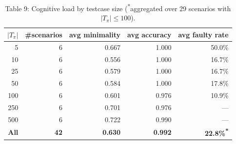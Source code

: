 \begin{table}[htbp]
\centering
\scriptsize
\begin{tabular}{rrrrr}
\toprule
$|T_\pi|$ & \#scenarios & avg minimality & avg accuracy & avg faulty rate \\
\midrule
5 & 6 & 0.667 & 1.000 & 50.0\% \\
10 & 6 & 0.556 & 1.000 & 16.7\% \\
25 & 6 & 0.579 & 1.000 & 16.7\% \\
50 & 6 & 0.584 & 1.000 & 17.8\% \\
100 & 6 & 0.601 & 0.976 & 10.9\% \\
250 & 6 & 0.701 & 0.976 & — \\
500 & 6 & 0.722 & 0.990 & — \\
\midrule
\textbf{All} & \textbf{42} & \textbf{0.630} & \textbf{0.992} & \textbf{22.8\%\textsuperscript{*}} \\
\bottomrule
\end{tabular}
\caption{Table 9: Cognitive load by testcase size (\textsuperscript{*}aggregated over 29 scenarios with $|T_\pi| \le 100$).}
\label{tab:table9}
\end{table}

